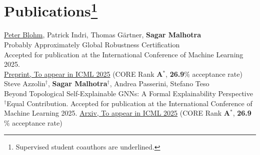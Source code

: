 \documentclass[10pt, a4paper]{article}
\newcommand{\years}[1]{\marginnote{\scriptsize #1}}
\begin{document}
\section*{Publications\protect\footnote{Supervised student coauthors are underlined.}}
\years{2025}\underline{Peter Blohm}, Patrick Indri, Thomas Gärtner, \textbf{Sagar Malhotra}\\ 
Probably Approximately Global Robustness Certification\\
Accepted for publication at the International Conference of Machine Learning 2025. \\
\href{https://countinglogic.github.io/files/Preprint.pdf}{Preprint, To appear in ICML 2025} (CORE Rank \textbf{A$^{*}$}, \textbf{26.9$\%$} acceptance rate)\\   

\years{2025} Steve Azzolin$^{\dagger}$, \textbf{Sagar Malhotra}$^{\dagger}$, Andrea Passerini, Stefano Teso\\
Beyond Topological Self-Explainable GNNs: A Formal Explainability Perspective\\
$^{\dagger}$Equal Contribution. Accepted for publication at the International Conference of Machine Learning 2025. \href{https://arxiv.org/abs/2502.02719}{Arxiv, To appear in ICML 2025} (CORE Rank \textbf{A$^{*}$}, \textbf{26.9$\%$} acceptance rate)\\
\end{document}
